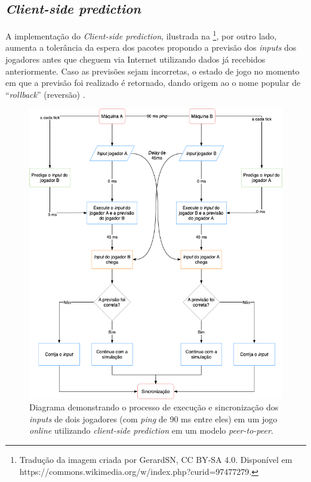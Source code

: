 \subsection{\textit{Client-side prediction}}

A implementação do \textit{Client-side prediction}, ilustrada na \footnote{Tradução da imagem criada por GerardSN, CC BY-SA 4.0. Disponível em https://commons.wikimedia.org/w/index.php?curid=97477279.}, por outro lado, aumenta a tolerância da espera dos pacotes propondo a previsão dos \textit{inputs} dos jogadores antes que cheguem via Internet utilizando dados já recebidos anteriormente. Caso as previsões sejam incorretas, o estado de jogo no momento em que a previsão foi realizado é retornado, dando origem ao o nome popular de ``\textit{rollback}'' (reversão) \cite{netcode}.

\begin{figure}[htbp]
\centering
\includegraphics[width=1\textwidth]{images/rollback.png}
\caption{Diagrama demonstrando o processo de execução e sincronização dos \textit{inputs} de dois jogadores (com \textit{ping} de 90 ms entre eles) em um jogo \textit{online} utilizando \textit{client-side prediction} em um modelo \textit{peer-to-peer}.}
\label{fig:rollback_diagram}
\end{figure}

